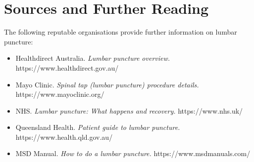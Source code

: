 \section*{Sources and Further Reading}
The following reputable organisations provide further information on lumbar puncture:
\begin{itemize}
    \item Healthdirect Australia. \textit{Lumbar puncture overview.} https://www.healthdirect.gov.au/
    \item Mayo Clinic. \textit{Spinal tap (lumbar puncture) procedure details.} https://www.mayoclinic.org/
    \item NHS. \textit{Lumbar puncture: What happens and recovery.} https://www.nhs.uk/
    \item Queensland Health. \textit{Patient guide to lumbar puncture.} https://www.health.qld.gov.au/
    \item MSD Manual. \textit{How to do a lumbar puncture.} https://www.msdmanuals.com/
\end{itemize}
